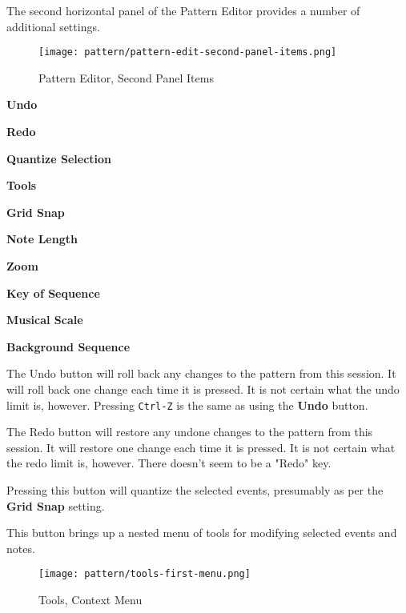    The second horizontal panel of the Pattern Editor provides a number
   of additional settings.

\begin{figure}[H]
   \centering 
   \texttt{[image: pattern/pattern-edit-second-panel-items.png]}
   \caption{Pattern Editor, Second Panel Items}
   \label{fig:pattern_editor_main_panel_items}
\end{figure}

   \begin{enumber}
      \item \textbf{Undo}
      \item \textbf{Redo}
      \item \textbf{Quantize Selection}
      \item \textbf{Tools}
      \item \textbf{Grid Snap}
      \item \textbf{Note Length}
      \item \textbf{Zoom}
      \item \textbf{Key of Sequence}
      \item \textbf{Musical Scale}
      \item \textbf{Background Sequence}
   \end{enumber}

   \setcounter{ItemCounter}{0}      %

   The Undo button will roll back any changes to the pattern from this
   session.
   It will roll back one change each time it is pressed.
   It is not certain what the undo limit is, however.
   Pressing \texttt{Ctrl-Z} is the same as using the \textbf{Undo} button.

   The Redo button will restore any undone changes to the pattern from this
   session.
   It will restore one change each time it is pressed.
   It is not certain what the redo limit is, however.
   There doesn't seem to be a "Redo" key.

   Pressing this button will quantize the selected events, presumably as per
   the \textbf{Grid Snap} setting.

   This button brings up a nested menu of tools for modifying selected
   events and notes.

\begin{figure}[H]
   \centering 
   \texttt{[image: pattern/tools-first-menu.png]}
   \caption{Tools, Context Menu}
   \label{fig:pattern_editor_tools_first_menu}
\end{figure}

